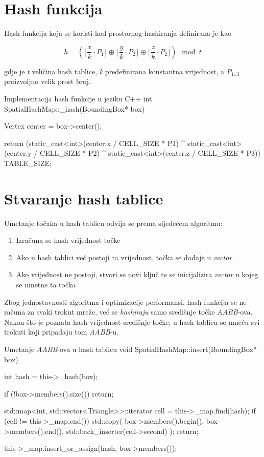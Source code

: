 \pagebreak
\section{Hash funkcija}

Hash funkcija koja se koristi kod prostornog hashiranja definirana je kao

\begin{equation}
    h = (\lfloor \frac{x}{k} \cdot P_1 \rfloor \oplus \lfloor \frac{y}{k} \cdot P_2 \rfloor \oplus \lfloor \frac{z}{k} \cdot P_2 \rfloor) \mod t
\end{equation}

gdje je \textit{t} veličina hash tablice, \textit{k} predefinirana
konstantna vrijednost, a $ P_{1..3} $ proizvoljno velik prost broj. ~\cite{spatialhashing}

\begin{cppSource}{Implementacija hash funkcije u jeziku C++}
int SpatialHashMap::_hash(BoundingBox* box) {
    Vertex center = box->center();

    return (static_cast<int>(center.x / CELL_SIZE * P1) ^
            static_cast<int>(center.y / CELL_SIZE * P2) ^
            static_cast<int>(center.z / CELL_SIZE * P3)) %
           TABLE_SIZE;
}
\end{cppSource}

\section{Stvaranje hash tablice}

Umetanje točaka u hash tablicu odvija se prema sljedećem algoritmu:

\begin{enumerate}
    \item Izračuna se hash vrijednost točke
    \item Ako u hash tablici već postoji ta vrijednost, točka se dodaje u \textit{vector}
    \item Ako vrijednost ne postoji, stvori se novi ključ te se inicijalizira \textit{vector}
          u kojeg se umetne ta točka
\end{enumerate}

Zbog jednostavnosti algoritma i optimizacije performansi, hash funkcija se ne
računa za svaki trokut mreže, već se \textit{hashiraju} samo središnje točke
\textit{AABB}-ova. Nakon što je poznata hash vrijednost središnje točke, u
hash tablicu se umeću svi trokuti koji pripadaju tom \textit{AABB}-u.


\begin{cppSource}{Umetanje \textit{AABB}-ova u hash tablicu}
void SpatialHashMap::insert(BoundingBox* box) {
    int hash = this->_hash(box);

    if (!box->members().size()) return;

    std::map<int, std::vector<Triangle>>::iterator cell = this->_map.find(hash);
    if (cell != this->_map.end()) {
        std::copy(
            box->members().begin(),
            box->members().end(),
            std::back_inserter(cell->second)
        );
        return;
    }

    this->_map.insert_or_assign(hash, box->members());
}
\end{cppSource}

